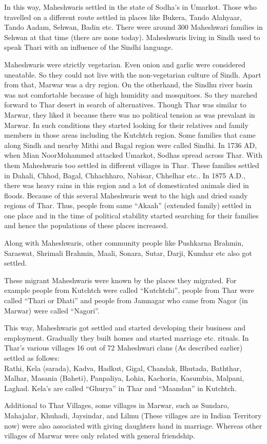 In this way, Maheshwaris settled in the state of Sodha's in Umarkot. Those who travelled on a different route settled in places like Bukera, Tando Alahyaar, Tando Aadam, Sehwan, Badin etc. There were around 300 Maheshwari families in Sehwan at that time (there are none today). Maheshwaris living in Sindh used to speak Thari with an influence of the Sindhi language.

Maheshwaris were strictly vegetarian. Even onion and garlic were considered uneatable. So they could not live with the non-vegetarian culture of Sindh. Apart from that, Marwar was a dry region. On the otherhand, the Sindhu river basin was not comfortable because of high humidity and mosquitoes. So they marched forward to Thar desert in search of alternatives. Though Thar was similar to Marwar, they liked it because there was no political tension as was prevalant in Marwar. In such conditions they started looking for their relatives and family members in those areas including the Kutchtch region. Some families that came along Sindh and nearby Mithi and Bagal region were called Sindhi. In 1736 AD, when Mian NoorMohammed attacked Umarkot, Sodhas spread across Thar. With them Maheshwaris too settled in different villages in Thar. These families settled in Dahali, Chhod, Bagal, Chhachharo, Nabisar, Chhelhar etc.. In 1875 A.D., there was heavy rains in this region and a lot of domesticated animals died in floods. Because of this several Maheshwaris went to the high and dried sandy regions of Thar. Thus, people from same ``Akaah'' (extended family) settled in one place and in the time of political stability started searching for their families and hence the populations of these places increased.

Along with Maheshwaris, other community people like Pushkarna Brahmin, Saraswat, Shrimali Brahmin, Maali, Sonara, Sutar, Darji, Kumhar etc also got settled.

These migrant Maheshwaris were known by the places they migrated. For example people from Kutchtch were called ``Kutchtchi'', people from Thar were called ``Thari or Dhati'' and people from Jamnagar who came from Nagor (in Marwar) were called ``Nagori''.

This way, Maheshwaris got settled and started developing their business and employment. Gradually they built homes and started marriage etc. rituals. In Thar's various villages 16 out of 72 Maheshwari clans (As described earlier) settled as follows:\\
Rathi, Kela (sarada), Kadva, Hadkut, Gigal, Chandak, Bhutada, Baththar, Malhar, Masania (Baheti), Panpaliya, Lohia, Kachoria, Kasumbia, Malpani, Laghad. Kela's are called ``Ghurya'' in Thar and ``Maandan'' in Kutchtch.

Additional to Thar Villages, some villages in Marwar, such as Sundaro, Mahajalar, Khuhadi, Jaysindar, and Lilmu (These villages are in Indian Territory now) were also associated with giving daughters hand in marriage. Whereas other villages of Marwar were only related with general friendship.
